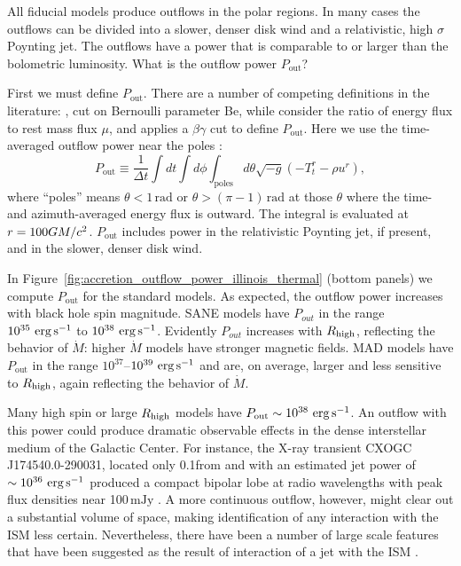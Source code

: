 All fiducial models produce outflows in the polar regions.
In many cases the outflows can be divided into a slower, denser disk wind and a relativistic, high $\sigma$ Poynting jet.
The outflows have a power that is comparable to or larger than the bolometric luminosity.
What is the outflow power $P_\mathrm{out}$?

First we must define $P_\mathrm{out}$.
There are a number of competing definitions in the literature: \citet{refId0}, \citet{2014A&A...570A...7M} cut on  Bernoulli parameter Be, while \citet{10.1111/j.1365-2966.2012.22002.x} consider the ratio of energy flux to rest mass flux $\mu$, and  applies a $\beta\gamma$ cut to define $P_\mathrm{out}$.
Here we use the time-averaged outflow power near the poles :
\begin{equation}
  P_\mathrm{out} \equiv \frac{1}{\Delta t}\int dt \int d\phi \int_\mathrm{poles} d\theta \sqrt{-g}\left(-T^{r}_{t}-\rho u^{r}\right),
\end{equation}
where ``poles'' means $\theta < 1\,\mathrm{rad}$ or $\theta > (\pi-1)\,\mathrm{rad}$ at those $\theta$ where the time- and azimuth-averaged energy flux is outward.
The integral is evaluated at $r = 100GM/c^2$.
$P_\mathrm{out}$ includes power in the relativistic Poynting jet, if present, and in the slower, denser disk wind.

In Figure~\ref{fig:accretion_outflow_power_illinois_thermal}
(bottom panels) we compute $P_\mathrm{out}$ for the standard models.
As expected, the outflow power increases with black hole spin magnitude.
SANE models have $P_{out}$ in the range ~$10^{35} \,\,\mathrm{erg}\,\mathrm{s}^{-1}$ to $10^{38} \,\,\mathrm{erg}\,\mathrm{s}^{-1}$.
Evidently $P_{out}$ increases with $R_\mathrm{high}$,  reflecting the behavior of $\dot{M}$: higher $\dot{M}$ models have stronger magnetic fields.
MAD models have $P_\mathrm{out}$ in the range $10^{37}$--$10^{39} \,\,\mathrm{erg}\,\mathrm{s}^{-1}$ and are, on average, larger and less sensitive to $R_\mathrm{high}$, again reflecting the behavior of $\dot{M}$.

Many high spin or large $R_\mathrm{high}$ models have $P_\mathrm{out} \sim 10^{38} \,\,\mathrm{erg}\,\mathrm{s}^{-1}$.
An outflow with this power could produce dramatic observable effects in the dense interstellar medium of the Galactic Center.
For instance, the X-ray transient CXOGC J174540.0-290031, located only 0.1\pc from \sgra and with an estimated jet power of $\sim 10^{36}\,\,\mathrm{erg}\,\mathrm{s}^{-1}$ produced a compact bipolar lobe at radio wavelengths with peak flux densities near 100$\,\mathrm{mJy}$ \citep{2005ApJ...633..218B}.
A more continuous  outflow, however, might clear out a substantial volume of space, making identification of any interaction with the ISM less certain.
Nevertheless, there have been a number of large scale features that have been suggested as the result of interaction of a jet with the ISM \citep[e.g.,][]{2013ApJ...779..154L,2021ApJ...922..254C}.

